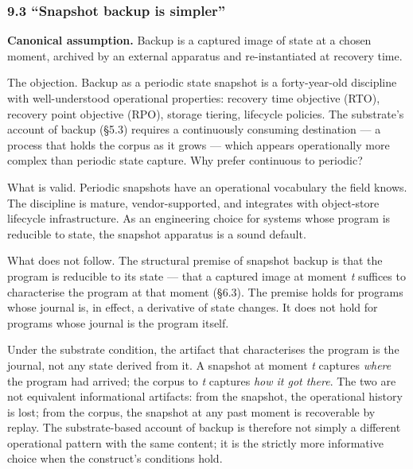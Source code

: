 \documentclass[
]{article}
\begin{document}
\subsubsection{9.3 ``Snapshot backup is
simpler''}\label{snapshot-backup-is-simpler}

\textbf{Canonical assumption.} Backup is a captured image of state at a
chosen moment, archived by an external apparatus and re-instantiated at
recovery time.

The objection. Backup as a periodic state snapshot is a forty-year-old
discipline with well-understood operational properties: recovery time
objective (RTO), recovery point objective (RPO), storage tiering,
lifecycle policies. The substrate's account of backup (§5.3) requires a
continuously consuming destination --- a process that holds the corpus
as it grows --- which appears operationally more complex than periodic
state capture. Why prefer continuous to periodic?

What is valid. Periodic snapshots have an operational vocabulary the
field knows. The discipline is mature, vendor-supported, and integrates
with object-store lifecycle infrastructure. As an engineering choice for
systems whose program is reducible to state, the snapshot apparatus is a
sound default.

What does not follow. The structural premise of snapshot backup is that
the program is reducible to its state --- that a captured image at
moment \emph{t} suffices to characterise the program at that moment
(§6.3). The premise holds for programs whose journal is, in effect, a
derivative of state changes. It does not hold for programs whose journal
is the program itself.

Under the substrate condition, the artifact that characterises the
program is the journal, not any state derived from it. A snapshot at
moment \emph{t} captures \emph{where} the program had arrived; the
corpus to \emph{t} captures \emph{how it got there}. The two are not
equivalent informational artifacts: from the snapshot, the operational
history is lost; from the corpus, the snapshot at any past moment is
recoverable by replay. The substrate-based account of backup is
therefore not simply a different operational pattern with the same
content; it is the strictly more informative choice when the construct's
conditions hold.
\end{document}
